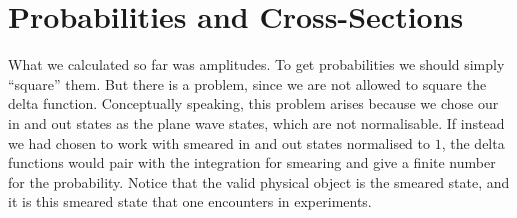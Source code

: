\documentclass[11pt, notitlepage]{report}
\numberwithin{equation}{section}
\begin{document}
    \newpage
    \section{Probabilities and Cross-Sections}
    What we calculated so far was amplitudes. To get probabilities we should simply ``square'' them. But there is a problem, since we are not allowed to square the delta function. Conceptually speaking, this problem arises because we chose our in and out states as the plane wave states, which are not normalisable. If instead we had chosen to work with smeared in and out states normalised to \(1\), the delta functions would pair with the integration for smearing and give a finite number for the probability. Notice that the valid physical object is the smeared state, and it is this smeared state that one encounters in experiments.   
\end{document}
